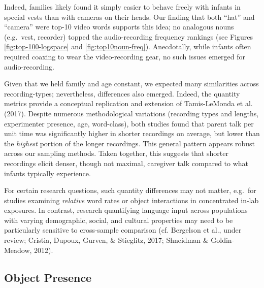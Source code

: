 \documentclass[man]{apa6}
\theoremstyle{definition}
\theoremstyle{definition}
\theoremstyle{definition}
\theoremstyle{remark}
\begin{document}
Indeed, families likely found it simply easier to behave freely with
infants in special vests than with cameras on their heads. Our finding
that both \enquote{hat} and \enquote{camera} were top-10 video words
supports this idea; no analogous nouns (e.g.~vest, recorder) topped the
audio-recording frequency rankings (see Figures
\ref{fig:top-100-logspace} and \ref{fig:top10noun-freq}). Anecdotally,
while infants often required coaxing to wear the video-recording gear,
no such issues emerged for audio-recording.

Given that we held family and age constant, we expected many
similarities across recording-types; nevertheless, differences also
emerged. Indeed, the quantity metrics provide a conceptual replication
and extension of Tamis-LeMonda et al. (2017). Despite numerous
methodological variations (recording types and lengths, experimenter
presence, age, word-class), both studies found that parent talk per unit
time was significantly higher in shorter recordings on average, but
lower than the \emph{highest} portion of the longer recordings. This
general pattern appears robust across our sampling methods. Taken
together, this suggests that shorter recordings elicit denser, though
not maximal, caregiver talk compared to what infants typically
experience.

For certain research questions, such quantity differences may not
matter, e.g.~for studies examining \emph{relative} word rates or object
interactions in concentrated in-lab exposures. In contrast, research
quantifying language input across populations with varying demographic,
social, and cultural properties may need to be particularly sensitive to
cross-sample comparison (cf. Bergelson et al., under review; Cristia,
Dupoux, Gurven, \& Stieglitz, 2017; Shneidman \& Goldin-Meadow, 2012).

\subsection{Object Presence}\label{object-presence}
\end{document}
